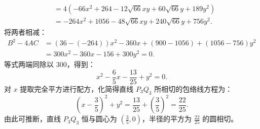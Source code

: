 \begin{solution}
\begin{align*}
&= 4 \left( -66x^2 + 264 - 12\sqrt{66}xy + 60\sqrt{66}y + 189y^2 \right) \\
&= -264x^2 + 1056 - 48\sqrt{66} x y + 240\sqrt{66} y + 756y^2.
\end{align*}
将两者相减：
\begin{align*}
B^2 - 4AC &= (36 - (-264))x^2 - 360x + (900 - 1056) + (1056 - 756)y^2 \\
&= 300x^2 - 360x - 156 + 300y^2 = 0.
\end{align*}
等式两端同除以 $300$，得到：
\[
x^2 - \frac{6}{5}x - \frac{13}{25} + y^2 = 0.
\]
对 $x$ 提取完全平方进行配方，化简得直线 $P_3Q_3$ 所相切的包络线方程为：
\[
\left(x - \frac{3}{5}\right)^2 + y^2 = \frac{13}{25} + \left(\frac{3}{5}\right)^2 = \frac{22}{25}.
\]
由此可推断，直线 $P_3Q_3$ 恒与圆心为 $\left(\frac{3}{5}, 0\right)$，半径的平方为 $\frac{22}{25}$ 的圆相切。
\end{solution}


